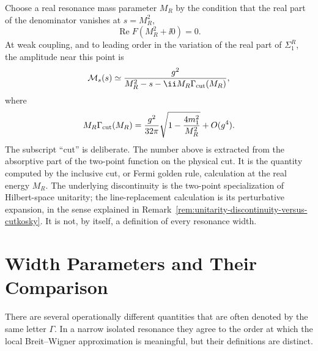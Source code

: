 Choose a real resonance mass parameter \(M_R\) by the condition that the real
part of the denominator vanishes at \(s=M_R^2\),
\[
  \operatorname{Re}F(M_R^2+\ii0)=0 .
\]
At weak coupling, and to leading order in the variation of the real part of
\(\Sigma_1^R\), the amplitude near this point is
\[
  \mathcal M_s(s)
  \simeq
  \frac{g^2}{M_R^2-s-\ii M_R\Gamma_{\rm cut}(M_R)},
\]
where
\[
  M_R\Gamma_{\rm cut}(M_R)
  =
  \frac{g^2}{32\pi}
  \sqrt{1-\frac{4m_1^2}{M_R^2}}
  +O(g^4).
\]
The subscript ``cut'' is deliberate.  The number above is extracted from the
absorptive part of the two-point function on the physical cut.  It is the
quantity computed by the inclusive cut, or Fermi golden rule, calculation at
the real energy \(M_R\).  The underlying discontinuity is the two-point
specialization of Hilbert-space unitarity; the line-replacement calculation is
its perturbative expansion, in the sense explained in
Remark~\ref{rem:unitarity-discontinuity-versus-cutkosky}.  It is not, by
itself, a definition of every resonance width.

\section{Width Parameters and Their Comparison}

There are several operationally different quantities that are often denoted by
the same letter \(\Gamma\).  In a narrow isolated resonance they agree to the
order at which the local Breit--Wigner approximation is meaningful, but their
definitions are distinct.

